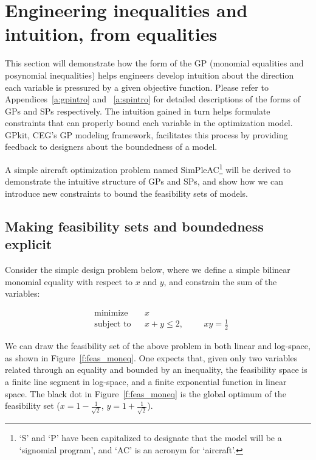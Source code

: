 \chapter{Engineering inequalities and intuition, from equalities}
\label{ch2:inequalities}

This section will demonstrate how the form of the \gls{GP} (monomial
equalities and posynomial inequalities) helps engineers develop intuition
about the direction each variable is pressured
by a given objective function. Please refer to Appendices~\ref{a:gpintro} and ~\ref{a:spintro}
for detailed descriptions of the forms of \gls{GP}s and \gls{SP}s respectively.
The intuition gained in turn helps formulate
constraints that can properly bound each variable in the optimization model.
GPkit, \gls{CEG}'s \gls{GP} modeling framework,
facilitates this process by providing feedback to designers about
the boundedness of a model.

A simple aircraft optimization problem named SimPleAC\footnote{`S' and `P' have been capitalized to designate that
the model will be a `signomial program', and `AC' is an acronym for `aircraft'.} will be derived to
demonstrate the intuitive structure of \gls{GP}s and \gls{SP}s, and show
how we can introduce new constraints to bound the feasibility sets of models.

\section{Making feasibility sets and boundedness explicit}

Consider the simple design problem below, where we define a simple bilinear
monomial equality with respect to $x$ and $y$, and constrain the sum of the variables:

\begin{equation*}
\begin{aligned}
& {\text{minimize}}
& & x \\
& \text{subject to}
& & x + y \leq 2,
    & & & xy = \frac{1}{2} \label{simple_moneq}
\end{aligned}
\end{equation*}

We can draw the feasibility set of the above problem in both linear and log-space,
as shown in Figure~\ref{f:feas_moneq}. One expects that, given only two variables
related through an equality and bounded by an inequality, the feasibility space is
a finite line segment in log-space, and a finite exponential function in linear space.
The black dot in Figure~\ref{f:feas_moneq} is the global optimum of the feasibility set
($x = 1 - \frac{1}{\sqrt{2}}$, $y = 1 + \frac{1}{\sqrt{2}}$).

